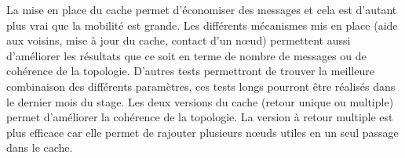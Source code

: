 La mise en place du cache permet d'économiser des messages et cela est d'autant plus vrai que la mobilité est grande. Les différents mécanismes mis en place (aide aux voisins, mise à jour du cache, contact d'un nœud) permettent aussi d'améliorer les résultats que ce soit en terme de nombre de messages ou de cohérence de la topologie. D'autres tests permettront de trouver la meilleure combinaison des différents paramètres, ces tests longs pourront être réalisés dans le dernier mois du stage. Les deux versions du cache (retour unique ou multiple) permet d'améliorer la cohérence de la topologie. La version à retour multiple est plus efficace car elle permet de rajouter plusieurs nœuds utiles en un seul passage dans le cache.
 
